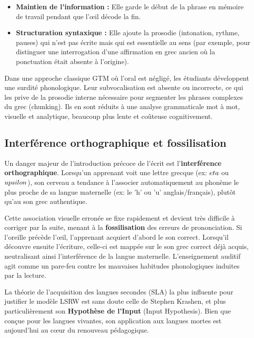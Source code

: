 \begin{itemize}\item \textbf{Maintien de l'information :} Elle garde le début de la phrase en mémoire de travail pendant que l'œil décode la fin.\cite{III-2-1-ref29}\item \textbf{Structuration syntaxique :} Elle ajoute la prosodie (intonation, rythme, pauses) qui n'est pas écrite mais qui est essentielle au sens (par exemple, pour distinguer une interrogation d'une affirmation en grec ancien où la ponctuation était absente à l'origine).\cite{III-2-1-ref29}\end{itemize}Dans une approche classique GTM où l'oral est négligé, les étudiants développent une \og surdité
phonologique\fg{}. Leur subvocalisation est absente ou incorrecte, ce qui les prive de la prosodie
interne nécessaire pour segmenter les phrases complexes du grec (chunking). Ils en sont réduits à
une analyse grammaticale mot à mot, visuelle et analytique, beaucoup plus lente et coûteuse
cognitivement.\cite{III-2-1-ref34}



\subsection{Interférence orthographique et fossilisation}

Un danger majeur de l'introduction précoce de l'écrit est l'\textbf{interférence
orthographique}.\cite{III-2-1-ref36} Lorsqu'un apprenant voit une lettre grecque (ex: $\\eta$ ou
$\\upsilon$), son cerveau a tendance à l'associer automatiquement au phonème le plus proche de sa
langue maternelle (ex: le 'h' ou 'u' anglais/français), plutôt qu'au son grec authentique.

Cette association visuelle erronée se fixe rapidement et devient très difficile à corriger par la
suite, menant à la \textbf{fossilisation} des erreurs de prononciation.\cite{III-2-1-ref38} Si
l'oreille précède l'œil, l'apprenant acquiert d'abord le son correct. Lorsqu'il découvre ensuite
l'écriture, celle-ci est mappée sur le son grec correct déjà acquis, neutralisant ainsi
l'interférence de la langue maternelle. L'enseignement auditif agit comme un pare-feu contre les
mauvaises habitudes phonologiques induites par la lecture.\cite{III-2-1-ref8}

La théorie de l'acquisition des langues secondes (SLA) la plus influente pour justifier le modèle
LSRW est sans doute celle de Stephen Krashen, et plus particulièrement son \textbf{Hypothèse de
l'Input} (Input Hypothesis).\cite{III-2-1-ref41} Bien que conçue pour les langues vivantes, son
application aux langues mortes est aujourd'hui au cœur du renouveau pédagogique.



